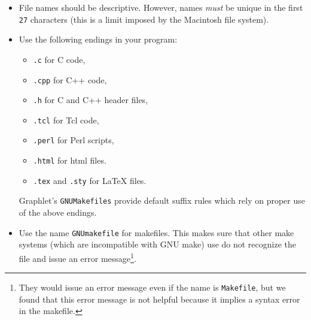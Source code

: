 \begin{itemize}

  \item 
  File names should be descriptive.  However, names \emph{must} be 
  unique in the first \texttt{27} characters (this is a limit imposed 
  by the Macintosh file system).
  
  \item  Use the following endings in your program:

  \begin{itemize}
    \item \texttt{.c} for C code,
    \item \texttt{.cpp} for C++ code,
    \item \texttt{.h} for C and C++ header files,
    \item \texttt{.tcl} for Tcl code,
    \item \texttt{.perl} for Perl scripts,
    \item \texttt{.html} for html files.
    \item \texttt{.tex} and \texttt{.sty} for LaTeX files.
  \end{itemize}
  
  \noindent Graphlet's \texttt{GNUMakefiles} provide default suffix
  rules which rely on proper use of the above endings.

  
  \item Use the name \texttt{GNUmakefile} for makefiles.  This
  makes sure that other make systems (which are incompatible with
  GNU make) use do not recognize the file and issue an error
  message\footnote{They would issue an error message even if the
    name is \texttt{Makefile}, but we found that this error
    message is not helpful because it implies a syntax error in
    the makefile.}.

\end{itemize}


